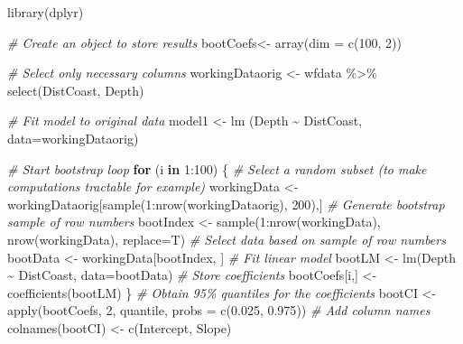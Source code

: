\documentclass[
  oneside]{krantz}
\newenvironment{Shaded}{\begin{snugshade}}{\end{snugshade}}
\newcommand{\AttributeTok}[1]{\textcolor[rgb]{0.77,0.63,0.00}{#1}}
\newcommand{\CommentTok}[1]{\textcolor[rgb]{0.56,0.35,0.01}{\textit{#1}}}
\newcommand{\ControlFlowTok}[1]{\textcolor[rgb]{0.13,0.29,0.53}{\textbf{#1}}}
\newcommand{\DecValTok}[1]{\textcolor[rgb]{0.00,0.00,0.81}{#1}}
\newcommand{\FloatTok}[1]{\textcolor[rgb]{0.00,0.00,0.81}{#1}}
\newcommand{\FunctionTok}[1]{\textcolor[rgb]{0.00,0.00,0.00}{#1}}
\newcommand{\NormalTok}[1]{#1}
\newcommand{\OtherTok}[1]{\textcolor[rgb]{0.56,0.35,0.01}{#1}}
\newcommand{\SpecialCharTok}[1]{\textcolor[rgb]{0.00,0.00,0.00}{#1}}
\newcommand{\StringTok}[1]{\textcolor[rgb]{0.31,0.60,0.02}{#1}}
\begin{document}
\begin{Shaded}
\begin{Highlighting}[]
\FunctionTok{library}\NormalTok{(dplyr)}

\CommentTok{\# Create an object to store results}
\NormalTok{bootCoefs}\OtherTok{\textless{}{-}} \FunctionTok{array}\NormalTok{(}\AttributeTok{dim =} \FunctionTok{c}\NormalTok{(}\DecValTok{100}\NormalTok{, }\DecValTok{2}\NormalTok{))}

\CommentTok{\# Select only necessary columns}
\NormalTok{workingDataorig }\OtherTok{\textless{}{-}}\NormalTok{ wfdata }\SpecialCharTok{\%\textgreater{}\%} \FunctionTok{select}\NormalTok{(DistCoast, Depth) }

\CommentTok{\# Fit model to original data}
\NormalTok{model1 }\OtherTok{\textless{}{-}} \FunctionTok{lm}\NormalTok{ (Depth }\SpecialCharTok{\textasciitilde{}}\NormalTok{ DistCoast, }\AttributeTok{data=}\NormalTok{workingDataorig)}

\CommentTok{\# Start bootstrap loop}
\ControlFlowTok{for}\NormalTok{ (i }\ControlFlowTok{in} \DecValTok{1}\SpecialCharTok{:}\DecValTok{100}\NormalTok{) \{}
  \CommentTok{\# Select a random subset (to make computations tractable for example)}
\NormalTok{  workingData }\OtherTok{\textless{}{-}}\NormalTok{ workingDataorig[}\FunctionTok{sample}\NormalTok{(}\DecValTok{1}\SpecialCharTok{:}\FunctionTok{nrow}\NormalTok{(workingDataorig), }\DecValTok{200}\NormalTok{),]}
  \CommentTok{\# Generate bootstrap sample of row numbers}
\NormalTok{  bootIndex }\OtherTok{\textless{}{-}} \FunctionTok{sample}\NormalTok{(}\DecValTok{1}\SpecialCharTok{:}\FunctionTok{nrow}\NormalTok{(workingData), }\FunctionTok{nrow}\NormalTok{(workingData), }\AttributeTok{replace=}\NormalTok{T)}
  \CommentTok{\# Select data based on sample of row numbers}
\NormalTok{  bootData }\OtherTok{\textless{}{-}}\NormalTok{ workingData[bootIndex, ]  }
  \CommentTok{\# Fit linear model}
\NormalTok{  bootLM }\OtherTok{\textless{}{-}} \FunctionTok{lm}\NormalTok{(Depth }\SpecialCharTok{\textasciitilde{}}\NormalTok{ DistCoast, }\AttributeTok{data=}\NormalTok{bootData)}
  \CommentTok{\# Store coefficients}
\NormalTok{  bootCoefs[i,] }\OtherTok{\textless{}{-}} \FunctionTok{coefficients}\NormalTok{(bootLM)}
\NormalTok{\}}
\CommentTok{\# Obtain 95\% quantiles for the coefficients}
\NormalTok{bootCI }\OtherTok{\textless{}{-}} \FunctionTok{apply}\NormalTok{(bootCoefs, }\DecValTok{2}\NormalTok{, quantile, }\AttributeTok{probs =} \FunctionTok{c}\NormalTok{(}\FloatTok{0.025}\NormalTok{, }\FloatTok{0.975}\NormalTok{))}
\CommentTok{\# Add column names}
\FunctionTok{colnames}\NormalTok{(bootCI) }\OtherTok{\textless{}{-}} \FunctionTok{c}\NormalTok{(}\StringTok{\textquotesingle{}Intercept\textquotesingle{}}\NormalTok{, }\StringTok{\textquotesingle{}Slope\textquotesingle{}}\NormalTok{)}


\end{Highlighting}
\end{Shaded}
\end{document}
